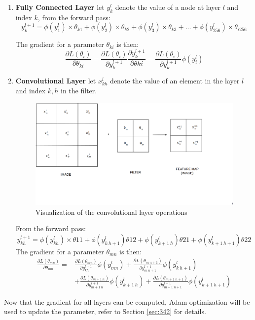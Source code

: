         \begin{enumerate}
            \item \textbf{Fully Connected Layer} let $y^l_k$ denote the value of a node at layer $l$ and index $k$, from the forward pass:
            \begin{equation*}
                 y^{l+1}_k = \phi (y^l_1)\times \theta_{k1}+\phi (y^l_2) \times \theta_{k2}+\phi (y^l_3)\times \theta_{k3}+...+\phi (y^l_{256})\times \theta_{i256}
            \end{equation*}
            
            The gradient for a parameter $\theta_{ki}$ is then:
            \begin{equation*}
                \frac{\partial L(\theta_i)}{\partial \theta_{ki}}=\frac{\partial L(\theta_i)}{\partial y^{l+1}_k}\frac{\partial y^{l+1}_k}{\partial \theta{ki}}=\frac{\partial L(\theta_i)}{\partial y^{l+1}_k}\phi(y^l_i)
            \end{equation*}
           \item \textbf{Convolutional Layer} let $x^l_{kh}$ denote the value of an element in the layer $l$ and index $k,h$ in the filter.  
           \begin{figure}[H]
               \centering
               \includegraphics[scale=0.2]{images/convlayer2.png}
               \caption{Visualization of the convolutional layer operations}
               \label{fig:convlayer2}
           \end{figure}From the forward pass:
           \begin{equation*}
               y^{l+1}_{kh} = \phi (y^l_{kh})\times \theta{11}+\phi (y^l_{k \ h+1}) \theta{12}+\phi (y^l_{k+1 \ h}) \theta{21} + \phi (y^l_{k+1 \ h+1}) \theta{22}
           \end{equation*}
            The gradient for a parameter $\theta_{mn}$ is then:
           \begin{align*}
                \frac{\partial L(\theta_{mn})}{\partial \theta_{mn}}=& \frac{\partial L(\theta_{mn})}{\partial y^{l+1}_{kh}}\phi(y^l_{mn})+\frac{\partial L(\theta_{m \ n+1})}{\partial y^{l+1}_{m\ n+1}}\phi(y^l_{k \ h+1}) \\
                & +\frac{\partial L(\theta_{m+1 \ n})}{\partial y^{l+1}_{m+1\ n}}\phi(y^l_{k+1 \ h})+\frac{\partial L(\theta_{m +1\ n+1})}{\partial y^{l+1}_{m+1\ n+1}}\phi(y^l_{k+1 \ h+1})
            \end{align*}
        \end{enumerate}
    Now that the gradient for all layers can be computed, Adam optimization will be used to update the parameter, refer to Section \ref{sec:342} for details.
    \fi